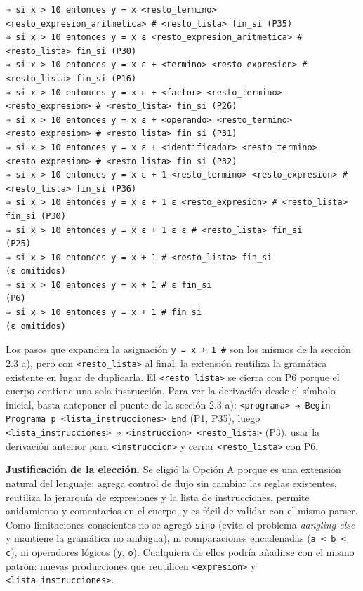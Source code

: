 \documentclass[11pt,letterpaper]{article}
\begin{document}
\begin{lstlisting}[basicstyle=\ttfamily\footnotesize]
⇒ si x > 10 entonces y = x <resto_termino> <resto_expresion_aritmetica> # <resto_lista> fin_si (P35)
⇒ si x > 10 entonces y = x ε <resto_expresion_aritmetica> # <resto_lista> fin_si (P30)
⇒ si x > 10 entonces y = x ε + <termino> <resto_expresion> # <resto_lista> fin_si (P16)
⇒ si x > 10 entonces y = x ε + <factor> <resto_termino> <resto_expresion> # <resto_lista> fin_si (P26)
⇒ si x > 10 entonces y = x ε + <operando> <resto_termino> <resto_expresion> # <resto_lista> fin_si (P31)
⇒ si x > 10 entonces y = x ε + <identificador> <resto_termino> <resto_expresion> # <resto_lista> fin_si (P32)
⇒ si x > 10 entonces y = x ε + 1 <resto_termino> <resto_expresion> # <resto_lista> fin_si (P36)
⇒ si x > 10 entonces y = x ε + 1 ε <resto_expresion> # <resto_lista> fin_si (P30)
⇒ si x > 10 entonces y = x ε + 1 ε ε # <resto_lista> fin_si                (P25)
⇒ si x > 10 entonces y = x + 1 # <resto_lista> fin_si                      (ε omitidos)
⇒ si x > 10 entonces y = x + 1 # ε fin_si                                   (P6)
⇒ si x > 10 entonces y = x + 1 # fin_si                                     (ε omitidos)
\end{lstlisting}

Los pasos que expanden la asignación \lstinline|y = x + 1 #| son los mismos de la sección 2.3 a), pero con
\lstinline|<resto_lista>| al final: la extensión reutiliza la gramática existente en lugar de duplicarla. El
\lstinline|<resto_lista>| se cierra con P6 porque el cuerpo contiene una sola instrucción. Para ver la
derivación desde el símbolo inicial, basta anteponer el puente de la sección 2.3 a):
\lstinline|<programa> ⇒ Begin Programa p <lista_instrucciones> End| (P1, P35), luego
\lstinline|<lista_instrucciones> ⇒ <instruccion> <resto_lista>| (P3), usar la derivación anterior para
\lstinline|<instruccion>| y cerrar \lstinline|<resto_lista>| con P6.

\textbf{Justificación de la elección.} Se eligió la Opción A porque es una extensión natural del lenguaje:
agrega control de flujo sin cambiar las reglas existentes, reutiliza la jerarquía de expresiones y la lista de
instrucciones, permite anidamiento y comentarios en el cuerpo, y es fácil de validar con el mismo parser. Como
limitaciones conscientes no se agregó \lstinline|sino| (evita el problema \emph{dangling-else} y mantiene la
gramática no ambigua), ni comparaciones encadenadas (\lstinline|a < b < c|), ni operadores lógicos
(\lstinline|y|, \lstinline|o|). Cualquiera de ellos podría añadirse con el mismo patrón: nuevas producciones
que reutilicen \lstinline|<expresion>| y \lstinline|<lista_instrucciones>|.
\end{document}
